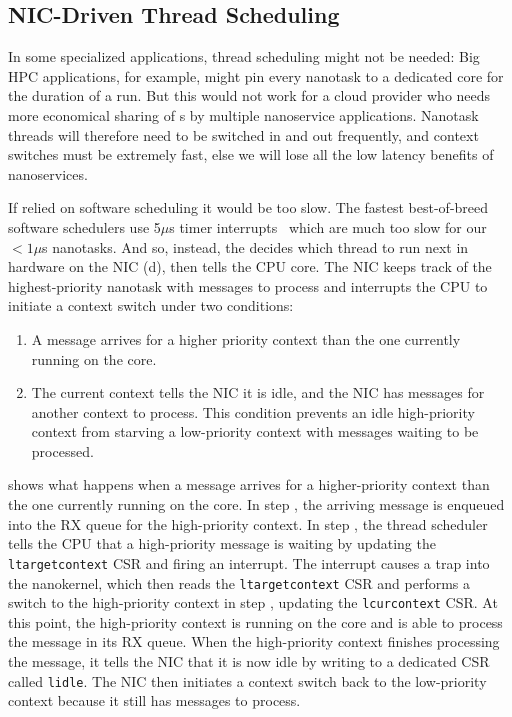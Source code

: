 \subsection{NIC-Driven Thread Scheduling}
\label{ssec:thread-scheduler}
In some specialized applications, thread scheduling might not be needed: Big HPC applications, for example, might pin every nanotask to a dedicated core for the duration of a run.
But this would not work for a cloud provider who needs more economical sharing of \name{}s by multiple nanoservice applications.
Nanotask threads will therefore need to be switched in and out frequently, and context switches must be extremely fast, else we will lose all the low latency benefits of nanoservices.

If \name{} relied on software scheduling it would be too slow. 
The fastest best-of-breed software schedulers use 5$\mu$s timer interrupts~\cite{shinjuku, shenango} which are much too slow for our $<1\mu$s nanotasks.
And so, instead, the \name{} decides which thread to run next in hardware on the NIC (d), then tells the CPU core. 
The NIC keeps track of the highest-priority nanotask with messages to process and interrupts the CPU to initiate a context switch under two conditions:

\begin{enumerate}
    \item A message arrives for a higher priority context than the one currently running on the core.
    \item The current context tells the NIC it is idle, and the NIC has messages for another context to process. 
    This condition prevents an idle high-priority context from starving a low-priority context with messages waiting to be processed.
\end{enumerate}

 shows what happens when a message arrives for a higher-priority context than the one currently running on the core. 
In step , the arriving message is enqueued into the RX queue for the high-priority context.
In step , the thread scheduler tells the CPU that a high-priority message is waiting by updating the \verb|ltargetcontext| CSR and firing an interrupt.
The interrupt causes a trap into the nanokernel, which then reads the \verb|ltargetcontext| CSR and performs a switch to the high-priority context in step , updating the \verb|lcurcontext| CSR.
At this point, the high-priority context is running on the core and is able to process the message in its RX queue.
When the high-priority context finishes processing the message, it tells the NIC that it is now idle by writing to a dedicated CSR called \verb|lidle|.
The NIC then initiates a context switch back to the low-priority context because it still has messages to process.

